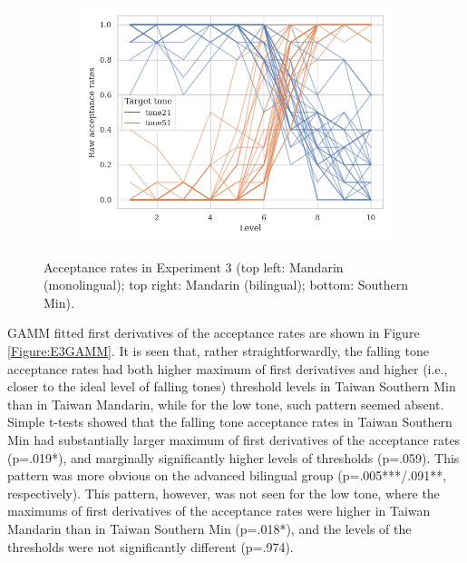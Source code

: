 \begin{figure}[hbt!]
\begin{subfigure}[b]{.45\textwidth}
\includegraphics[width=\textwidth]{figures/E3/Min_E3_raw.png}
\end{subfigure}
\caption{Acceptance rates in Experiment 3 (top left: Mandarin (monolingual); top right: Mandarin (bilingual); bottom: Southern Min).}
\label{Figure:E3Raw}
\end{figure}

GAMM fitted first derivatives of the acceptance rates are shown in Figure \ref{Figure:E3GAMM}. It is seen that, rather straightforwardly, the falling tone acceptance rates had both higher maximum of first derivatives and higher (i.e., closer to the ideal level of falling tones) threshold levels in Taiwan Southern Min than in Taiwan Mandarin, while for the low tone, such pattern seemed absent. Simple t-tests showed that the falling tone acceptance rates in Taiwan Southern Min had substantially larger maximum of first derivatives of the acceptance rates (p=.019*), and marginally significantly higher levels of thresholds (p=.059). This pattern was more obvious on the advanced bilingual group (p=.005***/.091**, respectively). This pattern, however, was not seen for the low tone, where the maximums of first derivatives of the acceptance rates were higher in Taiwan Mandarin than in Taiwan Southern Min (p=.018*), and the levels of the thresholds were not significantly different (p=.974).

